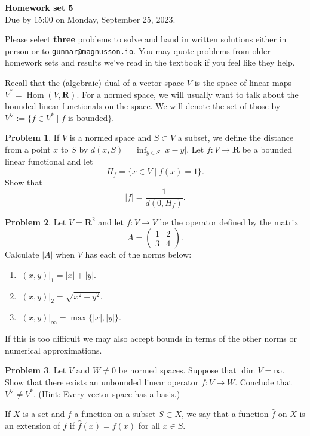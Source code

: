 \documentclass[11pt]{article}
\theoremstyle{definition}
\newtheorem{prob}{Problem}
\newcommand{\kk}[1]{\mathbf{#1}}
\DeclareMathOperator{\Hom}{Hom}
\def\head{
\begin{center}
\textbf{\LARGE Homework set 5}
\\[3pt]
Due by 15:00 on Monday, September 25, 2023.
\end{center}
\medskip
}
\begin{document}
\head

Please select \textbf{three} problems to solve and hand in written solutions
either in person or to \verb+gunnar@magnusson.io+. You may quote problems from
older homework sets and results we've read in the textbook if you feel like
they help.

Recall that the (algebraic) dual of a vector space $V$ is the space of
linear maps $V^* = \Hom(V, \kk R)$.
For a normed space, we will usually want to talk about the bounded linear
functionals on the space.
We will denote the set of those by
$V^\vee := \{ f \in V^* \mid \text{$f$ is bounded} \}$.

\begin{prob}
If $V$ is a normed space and $S \subset V$ a subset, we define the distance from
a point $x$ to $S$ by $d(x, S) = \inf_{y \in S} |x - y|$.
Let $f : V \to \kk R$ be a bounded linear functional and let
\[
H_f = \{ x \in V \mid f(x) = 1 \}.
\]
Show that
\[
|f| = \frac{1}{d(0, H_f)}.
\]
\end{prob}

\begin{prob}
Let $V = \kk R^2$ and let $f : V \to V$ be the operator defined by the matrix
\[
A = \begin{pmatrix}
1 & 2 \\ 3 & 4
\end{pmatrix}.
\]
Calculate $|A|$ when $V$ has each of the norms below:
\begin{enumerate}
\item
$|(x,y)|_1 = |x| + |y|$.

\item
$|(x,y)|_2 = \sqrt{x^2 + y^2}$.

\item
$|(x,y)|_\infty = \max\{|x|, |y|\}$.
\end{enumerate}
If this is too difficult we may also accept bounds in terms of the other norms
or numerical approximations.
\end{prob}

\begin{prob}
Let $V$ and $W \not= 0$ be normed spaces.
Suppose that $\dim V = \infty$.
Show that there exists an unbounded linear operator $f : V \to W$.
Conclude that $V^\vee \not= V^*$.
(Hint: Every vector space has a basis.)
\end{prob}


If $X$ is a set and $f$ a function on a subset $S \subset X$, we say that
a function $\hat f$ on $X$ is an extension of $f$ if $\hat f(x) = f(x)$ for
all $x \in S$.
\end{document}
